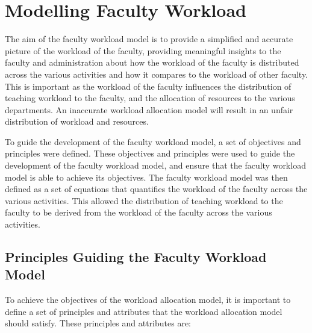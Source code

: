 \section{Modelling Faculty Workload}

The aim of the faculty workload model is to provide a simplified and accurate picture of the workload of the faculty, providing meaningful insights to the faculty and administration about how the workload of the faculty is distributed across the various activities and how it compares to the workload of other faculty. This is important as the workload of the faculty influences the distribution of teaching workload to the faculty, and the allocation of resources to the various departments. An inaccurate workload allocation model will result in an unfair distribution of workload and resources.

To guide the development of the faculty workload model, a set of objectives and principles were defined. These objectives and principles were used to guide the development of the faculty workload model, and ensure that the faculty workload model is able to achieve its objectives. The faculty workload model was then defined as a set of equations that quantifies the workload of the faculty across the various activities. This allowed the distribution of teaching workload to the faculty to be derived from the workload of the faculty across the various activities.

\subsection{Principles Guiding the Faculty Workload Model}
\label{sec:principles_guiding_workload_allocation_model}

To achieve the objectives of the workload allocation model, it is important to define a set of principles and attributes that the workload allocation model should satisfy. These principles and attributes are:

